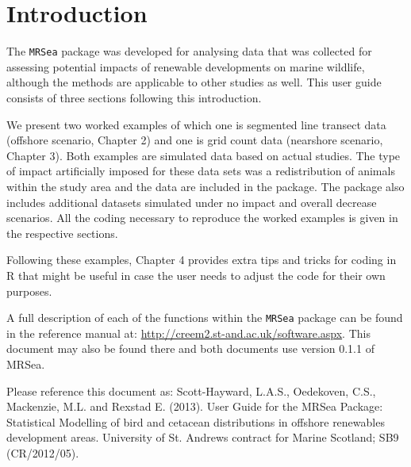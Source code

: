 \documentclass[11pt, a4paper]{report}
\begin{document}
\chapter{Introduction}
The {\tt MRSea} package was developed for analysing data that was collected for assessing potential impacts of renewable developments on marine wildlife, although the methods are applicable to other studies as well. This user guide consists of three sections following this introduction. 

\vspace{0.3cm}
We present two worked examples of which one is segmented line transect data (offshore scenario, Chapter 2) and one is grid count data (nearshore scenario, Chapter 3).  Both examples are simulated data based on actual studies. The type of impact artificially imposed for these data sets was a redistribution of animals within the study area and the data are included in the package. The package also includes additional datasets simulated under no impact and overall decrease scenarios. All the coding necessary to reproduce the worked examples is given in the respective sections. 

\vspace{0.3cm}
Following these examples, Chapter 4 provides extra tips and tricks for coding in R that might be useful in case the user needs to adjust the code for their own purposes.

\vspace{0.3cm}
A full description of each of the functions within the {\tt MRSea} package can be found in the reference manual at: \href{http://creem2.st-and.ac.uk/software.aspx}{http://creem2.st-and.ac.uk/software.aspx}.  This document may also be found there and both documents use version 0.1.1 of MRSea.

\vspace{0.3cm}
\begin{block}{Please reference this document as:}
\noindent Scott-Hayward, L.A.S., Oedekoven, C.S., Mackenzie, M.L. and Rexstad E. (2013). User Guide for the MRSea Package: Statistical Modelling of bird and cetacean distributions in offshore renewables development areas. University of St. Andrews contract for Marine Scotland; SB9 (CR/2012/05).
\end{block}

\newpage
\end{document}
